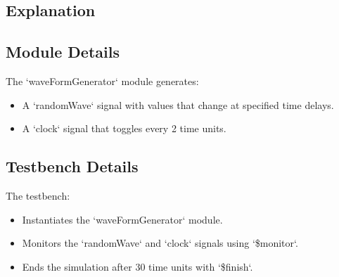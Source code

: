 \subsection*{Explanation}

\subsection*{Module Details}
The `waveFormGenerator` module generates:
\begin{itemize}
    \item A `randomWave` signal with values that change at specified time delays.
    \item A `clock` signal that toggles every 2 time units.
\end{itemize}

\subsection*{Testbench Details}
The testbench:
\begin{itemize}
    \item Instantiates the `waveFormGenerator` module.
    \item Monitors the `randomWave` and `clock` signals using `\$monitor`.
    \item Ends the simulation after 30 time units with `\$finish`.
\end{itemize}